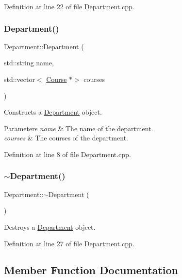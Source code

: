 Definition at line 22 of file Department.\+cpp.

\mbox{\label{classDepartment_a75a594311b114c794be126f5e2cd6a2d}} 
\subsubsection{\texorpdfstring{Department()}{Department()}\hspace{0.1cm}{\footnotesize\ttfamily [2/2]}}
{\footnotesize\ttfamily Department\+::\+Department (\begin{DoxyParamCaption}\item[{std\+::string}]{name,  }\item[{std\+::vector$<$ \hyperlink{classCourse}{Course} $\ast$$>$}]{courses }\end{DoxyParamCaption})}

Constructs a \hyperlink{classDepartment}{Department} object. 
\begin{DoxyParams}{Parameters}
{\em name} & The name of the department. \\
\hline
{\em courses} & The courses of the department. \\
\hline
\end{DoxyParams}


Definition at line 8 of file Department.\+cpp.

\mbox{\label{classDepartment_a15f5619c6679ffc80fe6de41c7a2e4a1}} 
\subsubsection{\texorpdfstring{$\sim$\+Department()}{~Department()}}
{\footnotesize\ttfamily Department\+::$\sim$\+Department (\begin{DoxyParamCaption}{ }\end{DoxyParamCaption})}

Destroys a \hyperlink{classDepartment}{Department} object. 

Definition at line 27 of file Department.\+cpp.



\subsection{Member Function Documentation}
\mbox{\label{classDepartment_a93ca2b0446a426603f62786693c57b47}} 
